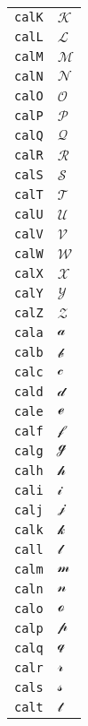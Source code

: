 \begin{longtable}{ll}
\texttt{calK}&${}\mathcal{K}{}$\\
\texttt{calL}&${}\mathcal{L}{}$\\
\texttt{calM}&${}\mathcal{M}{}$\\
\texttt{calN}&${}\mathcal{N}{}$\\
\texttt{calO}&${}\mathcal{O}{}$\\
\texttt{calP}&${}\mathcal{P}{}$\\
\texttt{calQ}&${}\mathcal{Q}{}$\\
\texttt{calR}&${}\mathcal{R}{}$\\
\texttt{calS}&${}\mathcal{S}{}$\\
\texttt{calT}&${}\mathcal{T}{}$\\
\texttt{calU}&${}\mathcal{U}{}$\\
\texttt{calV}&${}\mathcal{V}{}$\\
\texttt{calW}&${}\mathcal{W}{}$\\
\texttt{calX}&${}\mathcal{X}{}$\\
\texttt{calY}&${}\mathcal{Y}{}$\\
\texttt{calZ}&${}\mathcal{Z}{}$\\
\texttt{cala}&${}\mathcal{a}{}$\\
\texttt{calb}&${}\mathcal{b}{}$\\
\texttt{calc}&${}\mathcal{c}{}$\\
\texttt{cald}&${}\mathcal{d}{}$\\
\texttt{cale}&${}\mathcal{e}{}$\\
\texttt{calf}&${}\mathcal{f}{}$\\
\texttt{calg}&${}\mathcal{g}{}$\\
\texttt{calh}&${}\mathcal{h}{}$\\
\texttt{cali}&${}\mathcal{i}{}$\\
\texttt{calj}&${}\mathcal{j}{}$\\
\texttt{calk}&${}\mathcal{k}{}$\\
\texttt{call}&${}\mathcal{l}{}$\\
\texttt{calm}&${}\mathcal{m}{}$\\
\texttt{caln}&${}\mathcal{n}{}$\\
\texttt{calo}&${}\mathcal{o}{}$\\
\texttt{calp}&${}\mathcal{p}{}$\\
\texttt{calq}&${}\mathcal{q}{}$\\
\texttt{calr}&${}\mathcal{r}{}$\\
\texttt{cals}&${}\mathcal{s}{}$\\
\texttt{calt}&${}\mathcal{t}{}$\\

\end{longtable}
